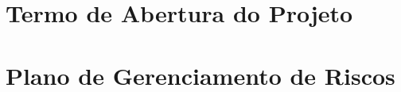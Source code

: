 \begin{apendicesenv}

\partapendices

\chapter{Termo de Abertura do Projeto}

\chapter{Plano de Gerenciamento de Riscos}

\end{apendicesenv}
